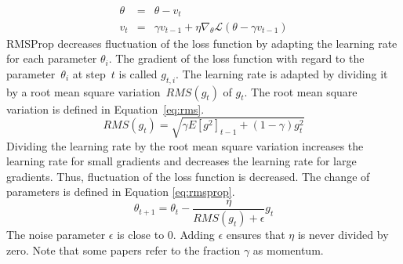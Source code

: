 \begin{equation}
	\label{eq:nesterov}
	\begin{array}{lcl}
		\theta & = & \theta - v_t\\
		v_t & = & \gamma v_{t-1} + \eta \nabla_{\theta} \mathcal{L}(\theta - \gamma v_{t-1})
	\end{array}
\end{equation}
%
\ac{RMSProp} decreases fluctuation of the loss function by adapting the learning rate for each parameter $\theta_i$. The gradient of the loss function with regard to the parameter~$\theta_i$ at step~$t$ is called $g_{t,i}$. The learning rate is adapted by dividing it by a root mean square variation~$RMS(g_t)$ of $g_t$. The root mean square variation is defined in Equation~\eqref{eq:rms}. \autocite{Ruder.2016}
\begin{equation}
	\label{eq:rms}
	RMS(g_t) = \sqrt{\gamma E[g^2]_{t-1} + (1-\gamma) g^2_t}
\end{equation}
Dividing the learning rate by the root mean square variation increases the learning rate for small gradients and decreases the learning rate for large gradients. Thus, fluctuation of the loss function is decreased. The change of parameters is defined in Equation \eqref{eq:rmsprop}. \autocite{Ruder.2016}
\begin{equation}
\label{eq:rmsprop}
	\theta_{t+1} = \theta_t - \frac{\eta}{RMS(g_t) + \epsilon} g_t
\end{equation}
The noise parameter $\epsilon$ is close to $0$. Adding $\epsilon$ ensures that $\eta$ is never divided by zero. \autocite{Ruder.2016}
Note that some papers refer to the fraction $\gamma$ as momentum. \autocites{Simonyan.2014}{He.2016}{Xie.2017}{Huang.2017}{Tan.2019}